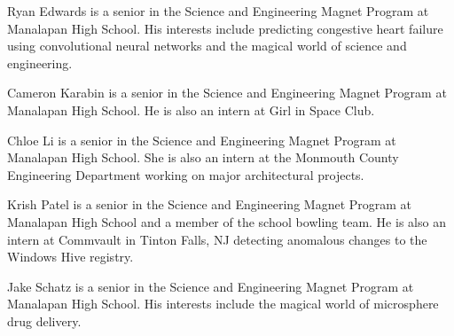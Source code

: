 \documentclass[10pt,journal,twoside]{IEEEtran}
\begin{document}




\begin{IEEEbiography}{Ryan Edwards} is a senior in the Science and Engineering Magnet Program at Manalapan High School. His interests include predicting congestive heart failure using convolutional neural networks and the magical world of science and engineering.
\end{IEEEbiography}
\begin{IEEEbiography}{Cameron Karabin} is a senior in the Science and Engineering Magnet Program at Manalapan High School. He is also an intern at Girl in Space Club.
\end{IEEEbiography}
\vfill
\newpage 
\begin{IEEEbiography}{Chloe Li} is a senior in the Science and Engineering Magnet Program at Manalapan High School. She is also an intern at the Monmouth County Engineering Department working on major architectural projects.
\end{IEEEbiography}
\begin{IEEEbiography}{Krish Patel} is a senior in the Science and Engineering Magnet Program at Manalapan High School and a member of the school bowling team. He is also an intern at Commvault in Tinton Falls, NJ detecting anomalous changes to the Windows Hive registry. 
\end{IEEEbiography}
\begin{IEEEbiography}{Jake Schatz} is a senior in the Science and Engineering Magnet Program at Manalapan High School. His interests include the magical world of microsphere drug delivery. 
\end{IEEEbiography}
\vfill
\end{document}
